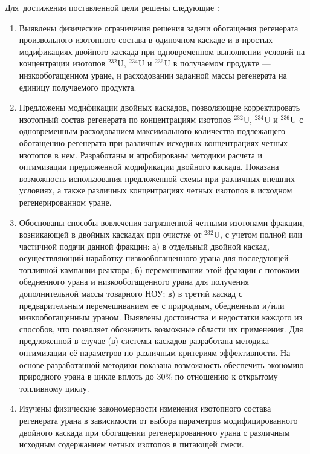 Для~достижения поставленной цели решены следующие {\tasks}:
\begin{enumerate}
  \item Выявлены физические ограничения решения задачи обогащения регенерата произвольного изотопного состава в одиночном каскаде и в простых модификациях двойного каскада при одновременном выполнении условий на концентрации изотопов $^{232}$U, $^{234}$U и $^{236}$U в получаемом продукте --- низкообогащенном уране, и расходовании заданной массы регенерата на единицу получаемого продукта.
  \item Предложены модификации двойных каскадов, позволяющие корректировать изотопный состав регенерата по концентрациям изотопов $^{232}$U, $^{234}$U и $^{236}$U с одновременным расходованием максимального количества подлежащего обогащению регенерата при различных исходных концентрациях четных изотопов в нем. Разработаны и апробированы методики расчета и оптимизации предложенной модификации двойного каскада. Показана возможность использования предложенной схемы при различных внешних условиях, а также различных концентрациях четных изотопов в исходном регенерированном уране.
  \item Обоснованы способы вовлечения загрязненной четными изотопами фракции, возникающей в двойных каскадах при очистке от $^{232}$U, с учетом полной или частичной подачи данной фракции: а) в отдельный двойной каскад, осуществляющий наработку низкообогащенного урана для последующей топливной кампании реактора; б) перемешивании этой фракции с потоками обедненного урана и низкообогащенного урана для получения дополнительной массы товарного НОУ; в) в третий каскад с предварительным перемешиванием ее с природным, обедненным и/или низкообогащенным ураном. Выявлены достоинства и недостатки каждого из способов, что позволяет обозначить возможные области их применения. Для предложенной в случае (в) системы каскадов разработана методика оптимизации её параметров по различным критериям эффективности. На основе разработанной методики показана возможность обеспечить экономию природного урана в цикле вплоть до 30\% по отношению к открытому топливному циклу.
  \item Изучены физические закономерности изменения изотопного состава регенерата урана в зависимости от выбора параметров модифицированного двойного каскада при обогащении регенерированного урана с различным исходным содержанием четных изотопов в питающей смеси.
\end{enumerate}

